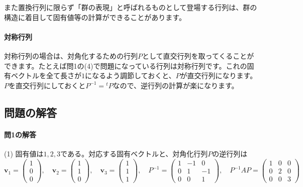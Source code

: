 また置換行列に限らず「群の表現」と呼ばれるものとして登場する行列は、群の構造に着目して固有値等の計算ができることがあります。

\paragraph{対称行列}

対称行列の場合は、対角化するための行列$P$として直交行列を取ってくることができます。たとえば問1の(4)で問題になっている行列は対称行列です。これの固有ベクトルを全て長さが$1$になるよう調節しておくと、$P$が直交行列になります。$P$を直交行列にしておくと$P^{-1} = {}^tP$なので、逆行列の計算が楽になります。

\subsection{問題の解答}

\paragraph{問1の解答}

(1) 固有値は$1, 2, 3$である。対応する固有ベクトルと、対角化行列$P$の逆行列は
\[
\bm{v}_1 = 
\begin{pmatrix}
1 \\
0 \\
0
\end{pmatrix}, \quad
\bm{v}_2 = 
\begin{pmatrix}
1 \\
1 \\
0
\end{pmatrix}, \quad
\bm{v}_3 = 
\begin{pmatrix}
1 \\
1 \\
1
\end{pmatrix}, \quad
P^{-1} = 
\begin{pmatrix}
1 & -1 & 0 \\
0 & 1 & -1 \\
0 & 0 & 1
\end{pmatrix}, \quad
P^{-1} AP =
\begin{pmatrix}
1 & 0 & 0 \\
0 & 2 & 0 \\
0 & 0 & 3
\end{pmatrix}
\]

